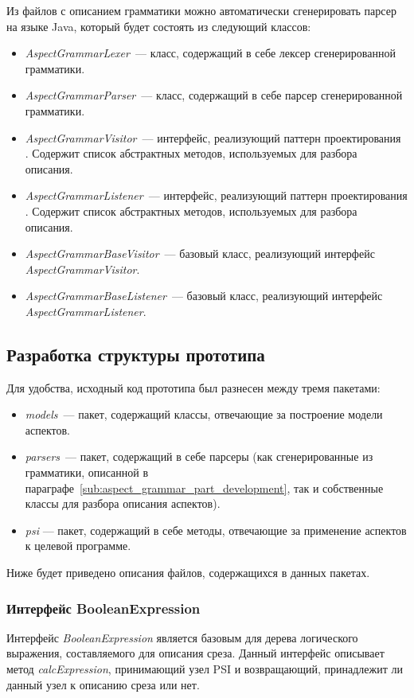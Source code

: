 Из файлов с описанием грамматики можно автоматически сгенерировать парсер на языке Java, который будет состоять из следующий классов:
\begin{itemize}
	\item \textit{AspectGrammarLexer}~--- класс, содержащий в себе лексер
		  сгенерированной грамматики.
	\item \textit{AspectGrammarParser}~--- класс, содержащий в себе парсер
		  сгенерированной грамматики.
	\item \textit{AspectGrammarVisitor}~--- интерфейс, реализующий паттерн проектирования .
	Содержит список абстрактных методов, используемых для разбора описания.
	\item \textit{AspectGrammarListener}~--- интерфейс, реализующий паттерн проектирования .
	Содержит список абстрактных методов, используемых для разбора описания.
	\item \textit{AspectGrammarBaseVisitor}~--- базовый класс, реализующий
		  интерфейс \textit{AspectGrammarVisitor}.
	\item \textit{AspectGrammarBaseListener}~--- базовый класс, реализующий
		  интерфейс \textit{AspectGrammarListener}.
\end{itemize}
\subsection{Разработка структуры прототипа}
\label{sub:aspect_weaving_part_development}
Для удобства, исходный код прототипа был разнесен между тремя пакетами:
\begin{itemize}
	\item \textit{models}~--- пакет, содержащий классы, отвечающие за построение
		  модели аспектов.
	\item \textit{parsers}~--- пакет, содержащий в себе парсеры (как
	сгенерированные из грамматики, описанной в параграфе~\ref{sub:aspect_grammar_part_development}, так и собственные классы для
	разбора описания аспектов).
	\item \textit{psi} --- пакет, содержащий в себе методы, отвечающие за
		  применение аспектов к целевой программе.
\end{itemize}
Ниже будет приведено описания файлов, содержащихся в данных пакетах.
\subsubsection{Интерфейс BooleanExpression}
\label{ssub:BooleanExpression}
Интерфейс \textit{BooleanExpression} является базовым для дерева логического
выражения, составляемого для описания среза.
Данный интерфейс описывает метод \textit{calcExpression}, принимающий узел PSI и возвращающий, принадлежит ли данный узел к описанию среза или нет.

